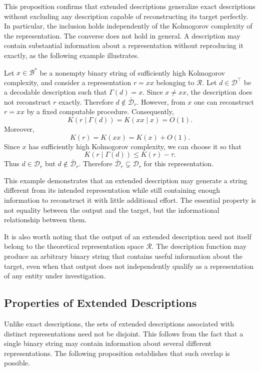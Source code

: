 This proposition confirms that extended descriptions generalize exact descriptions without excluding any description capable of reconstructing its target perfectly. In particular, the inclusion holds independently of the Kolmogorov complexity of the representation. The converse does not hold in general. A description may contain substantial information about a representation without reproducing it exactly, as the following example illustrates.

\begin{example}
Let $x\in\mathcal{B}^\ast$ be a nonempty binary string of sufficiently high Kolmogorov complexity, and consider a representation $r=xx$ belonging to $\mathcal{R}$. Let $d\in\mathcal{D}^\top$ be a decodable description such that $\Gamma(d)=x$. Since $x\neq xx$, the description does not reconstruct $r$ exactly. Therefore $d\notin\bar{\mathcal{D}}_r$. However, from $x$ one can reconstruct $r=xx$ by a fixed computable procedure. Consequently,
\[
K(r\mid\Gamma(d)) = K(xx\mid x) = O(1).
\]
Moreover,
\[
K(r)=K(xx)=K(x)+O(1).
\]
Since $x$ has sufficiently high Kolmogorov complexity, we can choose it so that
\[
K(r\mid\Gamma(d))\leq K(r)-\tau.
\]
Thus $d\in\mathcal{D}_r$ but $d\notin\bar{\mathcal{D}}_r$. Therefore $\bar{\mathcal{D}}_r\subsetneq\mathcal{D}_r$ for this representation.
\end{example}

This example demonstrates that an extended description may generate a string different from its intended representation while still containing enough information to reconstruct it with little additional effort. The essential property is not equality between the output and the target, but the informational relationship between them.

It is also worth noting that the output of an extended description need not itself belong to the theoretical representation space $\mathcal{R}$. The description function may produce an arbitrary binary string that contains useful information about the target, even when that output does not independently qualify as a representation of any entity under investigation.


\subsection*{Properties of Extended Descriptions}

Unlike exact descriptions, the sets of extended descriptions associated with distinct representations need not be disjoint. This follows from the fact that a single binary string may contain information about several different representations. The following proposition establishes that such overlap is possible.

